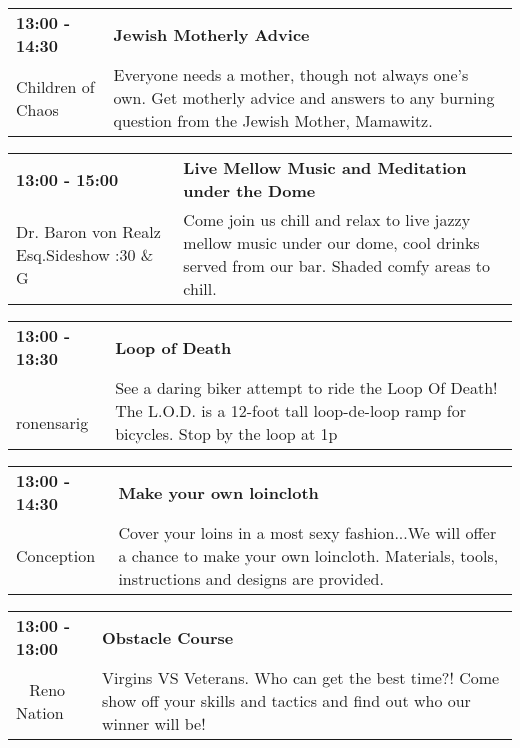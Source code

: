 \begin{tabular}{ p{1in} p{2.2in} }
    \textbf{13:00 - 14:30} & \textbf{Jewish Motherly Advice} \\
    Children of Chaos \newline  & Everyone needs a mother, though not always one's own.  Get motherly advice and answers to any burning question from the Jewish Mother, Mamawitz. \\
    \hline 
\end{tabular}
    
\begin{tabular}{ p{1in} p{2.2in} }
    \textbf{13:00 - 15:00} & \textbf{Live Mellow Music and Meditation under the Dome} \\
    Dr. Baron von Realz Esq.Sideshow \newline 4:30 \& G & Come join us chill and relax to live jazzy mellow music under our dome, cool drinks served from our bar. Shaded comfy areas to chill. \\
    \hline 
\end{tabular}
    
\begin{tabular}{ p{1in} p{2.2in} }
    \textbf{13:00 - 13:30} & \textbf{Loop of Death} \\
    ~ \newline ronensarig & See a daring biker attempt to ride the Loop Of Death! The L.O.D. is a 12-foot tall loop-de-loop ramp for bicycles. Stop by the loop at 1p \\
    \hline 
\end{tabular}
    
\begin{tabular}{ p{1in} p{2.2in} }
    \textbf{13:00 - 14:30} & \textbf{Make your own loincloth} \\
    Conception \newline  & Cover your loins in a most sexy fashion...We will offer a chance to make your own loincloth.  Materials, tools, instructions and designs are provided. \\
    \hline 
\end{tabular}
    
\begin{tabular}{ p{1in} p{2.2in} }
    \textbf{13:00 - 13:00} & \textbf{Obstacle Course} \\
    ~ \newline Reno Nation & Virgins VS Veterans. Who can get the best time?! Come show off your skills and tactics and find out who our winner will be! \\
    \hline 
\end{tabular}
    
